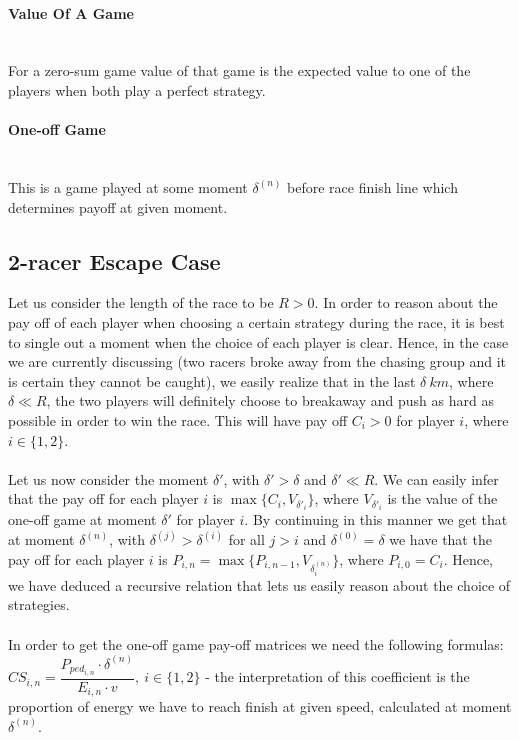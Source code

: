 \documentclass[10pt, a4paper]{report}
\begin{document}
\paragraph{Value Of A Game} ~\\
For a zero-sum game value of that game is the expected value to one of the players when both play a perfect strategy.

\paragraph{One-off Game} ~\\
This is a game played at some moment $\delta^{(n)}$ before race finish line which determines payoff at given moment.

\subsection{2-racer Escape Case}\label{subsec:zerosumgame}
Let us consider the length of the race to be $R > 0$. In order to reason about the pay off of each player when choosing a certain strategy during the race, it is best to single out a moment when the choice of each player is clear. Hence, in the case we are currently discussing (two racers broke away from the chasing group and it is certain they cannot be caught), we easily realize that in the last $\delta\ km$, where $\delta\ll R$, the two players will definitely choose to breakaway and push as hard as possible in order to win the race. This will have pay off $C_i>0$ for player $i$, where $i \in \{1,2\}$.
\\\\
Let us now consider the moment $\delta'$, with $\delta'>\delta$ and $\delta'\ll R$. We can easily infer that the pay off for each player $i$ is $\max\{C_i,V_{\delta'_i}\}$, where $V_{\delta'_i}$ is the value of the one-off game at moment $\delta'$ for player $i$. By continuing in this manner we get that at moment $\delta^{(n)}$, with $\delta^{(j)}>\delta^{(i)}$ for all $j>i$ and $\delta^{(0)}=\delta$ we have that the pay off for each player $i$ is $P_{i,n} = \max\{P_{i,n-1},V_{\delta^{(n)}_i}\}$, where $P_{i,0} = C_i$. Hence, we have deduced a recursive relation that lets us easily reason about the choice of strategies.
\\\\
In order to get the one-off game pay-off matrices we need the following formulas:\\
$CS_{i,n} = \dfrac{P_{ped_{i,n}} \cdot \delta^{(n)}}{E_{i,n} \cdot v},\ i\in\{1,2\}$ - the interpretation of this coefficient is the proportion of energy we have to reach finish at given speed, calculated at moment $\delta^(n)$.\\
\end{document}
